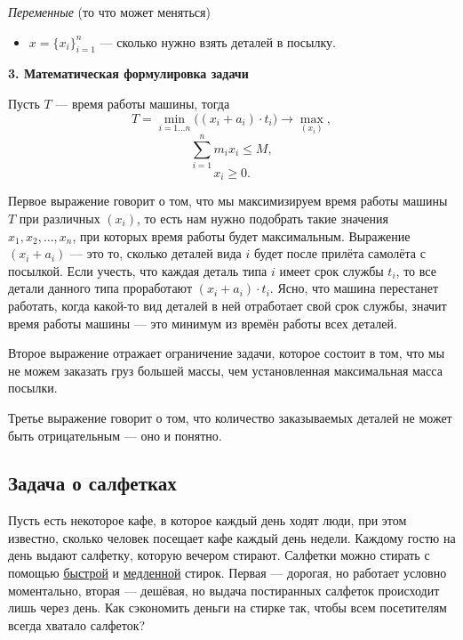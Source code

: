 \textit{Переменные} (то что может меняться)

\begin{itemize}[nosep]	
	\item $x = \{x_i\}_{i=1}^n$ --- сколько нужно взять деталей в посылку.
\end{itemize}

\bigskip

\textbf{3. Математическая формулировка задачи}

Пусть $T$ --- время работы машины, тогда
\[T = \min_{i = 1 \dots n} \big((x_i + a_i) \cdot t_i\big) \to \max_{(x_i)},\]
\[\sum_{i=1}^{n} m_i x_i \le M,\]
\[x_i \ge 0.\]

Первое выражение говорит о том, что мы максимизируем время работы машины $T$ при различных $(x_i)$, то есть нам нужно подобрать такие значения $x_1, x_2, \dots, x_n$, при которых время работы будет максимальным. Выражение $(x_i + a_i)$ --- это то, сколько деталей вида $i$ будет после прилёта самолёта с посылкой. Если учесть, что каждая деталь типа $i$ имеет срок службы $t_i$, то все детали данного типа проработают $(x_i + a_i) \cdot t_i$. Ясно, что машина перестанет работать, когда какой-то вид деталей в ней отработает свой срок службы, значит время работы машины --- это минимум из времён работы всех деталей.

Второе выражение отражает ограничение задачи, которое состоит в том, что мы не можем заказать груз большей массы, чем установленная максимальная масса посылки.

Третье выражение говорит о том, что количество заказываемых деталей не может быть отрицательным --- оно и понятно.

\subsection{Задача о салфетках}

\problem\label{pr:napkins}

Пусть есть некоторое кафе, в которое каждый день ходят люди, при этом известно, сколько человек посещает кафе каждый день недели. Каждому гостю на день выдают салфетку, которую вечером стирают. Салфетки можно стирать с помощью \underline{быстрой} и \underline{медленной} стирок. Первая --- дорогая, но работает условно моментально, вторая --- дешёвая, но выдача постиранных салфеток происходит лишь через день. Как сэкономить деньги на стирке так, чтобы всем посетителям всегда хватало салфеток?

\mathmodel

